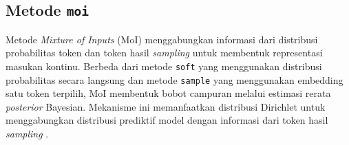 \subsection{Metode \texttt{moi}}
\label{subsec:metode-moi}

Metode \textit{Mixture of Inputs} (MoI) menggabungkan informasi dari distribusi probabilitas token dan token hasil \textit{sampling} untuk membentuk representasi masukan kontinu. Berbeda dari metode \texttt{soft} yang menggunakan distribusi probabilitas secara langsung dan metode \texttt{sample} yang menggunakan embedding satu token terpilih, MoI membentuk bobot campuran melalui estimasi rerata \textit{posterior} Bayesian. Mekanisme ini memanfaatkan distribusi Dirichlet untuk menggabungkan distribusi prediktif model dengan informasi dari token hasil \textit{sampling} \citep{moi}.

